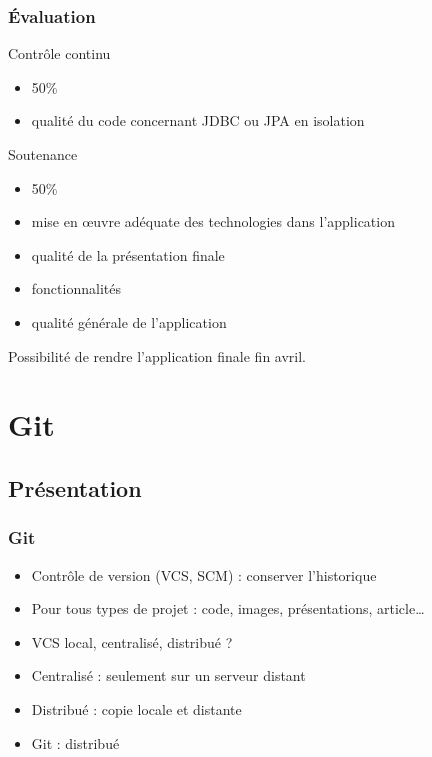 \documentclass[english, french]{beamer}
\begin{document}
\begin{frame}
	\frametitle{Évaluation}
	\begin{block}{Contrôle continu}
		\begin{itemize}
			\item 50\%
			\item qualité du code concernant JDBC ou JPA en isolation
		\end{itemize}
	\end{block}
	\begin{block}{Soutenance}
		\begin{itemize}
			\item 50\%
			\item mise en œuvre adéquate des technologies dans l’application
			\item qualité de la présentation finale
			\item fonctionnalités
			\item qualité générale de l’application
		\end{itemize}
	\end{block}
	Possibilité de rendre l’application finale fin avril.
\end{frame}

\section{Git}
\subsection{Présentation}
\begin{frame}
	\frametitle{Git}
	\begin{itemize}
		\item Contrôle de version (VCS, SCM) : conserver l’historique
		\item Pour tous types de projet : code, images, présentations, article…
		\item VCS local, centralisé, distribué ? \pause
		\item Centralisé : seulement sur un serveur distant
		\item Distribué : copie locale et distante
		\item Git : distribué
	\end{itemize}
\end{frame}
\end{document}
